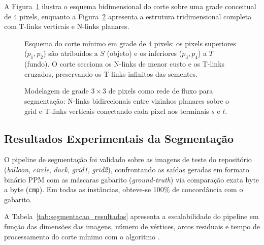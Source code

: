 A Figura~\ref{fig:segmentacao_corte} ilustra o esquema bidimensional do corte sobre uma grade conceitual de 4 pixels, enquanto a Figura~\ref{fig:grid_cut_3d} apresenta a estrutura tridimensional completa com T-links verticais e N-links planares.

\begin{figure}[!ht]
\centering
\resizebox{0.78\textwidth}{!}{%
%
}
\caption{Esquema do corte mínimo em grade de 4 pixels: os pixels superiores ($p_1, p_2$) são atribuídos a $S$ (objeto) e os inferiores ($p_3, p_4$) a $T$ (fundo). O corte secciona os N-links de menor custo e os T-links cruzados, preservando os T-links infinitos das sementes.}
\label{fig:segmentacao_corte}
\end{figure}

\begin{figure}[!ht]
\centering
\resizebox{0.78\textwidth}{!}{%
%
}
\caption{Modelagem de grade $3 \times 3$ de pixels como rede de fluxo para segmentação: N-links bidirecionais entre vizinhos planares sobre o grid e T-links verticais conectando cada pixel aos terminais $s$ e $t$.}
\label{fig:grid_cut_3d}
\end{figure}

\subsection{Resultados Experimentais da Segmentação}

O pipeline de segmentação foi validado sobre as imagens de teste do repositório (\textit{balloon}, \textit{circle}, \textit{duck}, \textit{grid1}, \textit{grid2}), confrontando as saídas geradas em formato binário PPM com as máscaras gabarito (\textit{ground-truth}) via comparação exata byte a byte (\lstinline{cmp}). Em todas as instâncias, obteve-se 100\% de concordância com o gabarito.

A Tabela~\ref{tab:segmentacao_resultados} apresenta a escalabilidade do pipeline em função das dimensões das imagens, número de vértices, arcos residuais e tempo de processamento do corte mínimo com o algoritmo .

